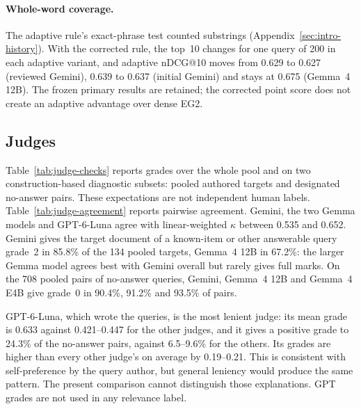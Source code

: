 \paragraph{Whole-word coverage.} The adaptive rule's exact-phrase test counted substrings (Appendix~\ref{sec:intro-history}). With the corrected rule, the top~10 changes for one query of 200 in each adaptive variant, and adaptive nDCG@10 moves from 0.629 to 0.627 (reviewed Gemini), 0.639 to 0.637 (initial Gemini) and stays at 0.675 (Gemma~4 12B). The frozen primary results are retained; the corrected point score does not create an adaptive advantage over dense EG2.

\subsection{Judges}
Table~\ref{tab:judge-checks} reports grades over the whole pool and on two construction-based diagnostic subsets: pooled authored targets and designated no-answer pairs. These expectations are not independent human labels. Table~\ref{tab:judge-agreement} reports pairwise agreement. Gemini, the two Gemma models and GPT-6-Luna agree with linear-weighted $\kappa$ between 0.535 and 0.652. Gemini gives the target document of a known-item or other answerable query grade~2 in 85.8\% of the 134 pooled targets, Gemma~4 12B in 67.2\%: the larger Gemma model agrees best with Gemini overall but rarely gives full marks. On the 708 pooled pairs of no-answer queries, Gemini, Gemma~4 12B and Gemma~4 E4B give grade~0 in 90.4\%, 91.2\% and 93.5\% of pairs.

GPT-6-Luna, which wrote the queries, is the most lenient judge: its mean grade is 0.633 against 0.421--0.447 for the other judges, and it gives a positive grade to 24.3\% of the no-answer pairs, against 6.5--9.6\% for the others. Its grades are higher than every other judge's on average by 0.19--0.21. This is consistent with self-preference by the query author, but general leniency would produce the same pattern. The present comparison cannot distinguish those explanations. GPT grades are not used in any relevance label.

\begin{table}[p]
\centering
\caption{Judges on the 5\,572 pooled pairs: mean grade, grade counts, and construction-based checks (share of pooled answerable-query targets graded 2; share of pooled no-answer pairs graded 0).}
\label{tab:judge-checks}

\end{table}

